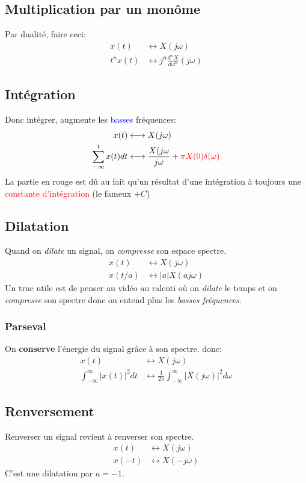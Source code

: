 \documentclass{report}
\begin{document}
\subsection{Multiplication par un monôme}
Par dualité, faire ceci:
\begin{align*}
x(t) &\longleftrightarrow X(j\omega)\\
t^nx(t) &\longleftrightarrow j^n \frac{d^nX}{d\omega^n} (j\omega)
\end{align*}
\subsection{Intégration}
Donc intégrer, augmente les \textcolor{blue}{basses} fréquences:
\begin{align*}
x(t) &\longleftrightarrow X(j\omega)\\
\sum_{-\infty}^t	x(t)dt &\longleftrightarrow \frac{X(j\omega}{j\omega} + \textcolor{red}{\pi X(0) \delta(\omega)}
\end{align*}
La partie en rouge est dû au fait qu'un résultat d'une intégration à toujours une \textcolor{red}{constante d'intégration} (le fameux $+C$)

\subsection{Dilatation}
Quand on \textit{dilate} un signal, on \textit{compresse} son espace spectre.
\begin{align*}
x(t) &\longleftrightarrow X(j\omega)\\
x(t/a) &\longleftrightarrow |a|X(aj\omega)
\end{align*}
Un truc utile est de penser au vidéo au ralenti où on \textit{dilate} le temps et on \textit{compresse} son spectre donc on entend plus les \textit{basses fréquences}.

\subsubsection{Parseval}
On \textbf{conserve} l'énergie du signal grâce à son spectre. donc:
\begin{align*}
x(t) &\longleftrightarrow X(j\omega)\\
\int_{-\infty}^{\infty} |x(t)|^2 dt &\longleftrightarrow \frac{1}{2\pi} \int_{-\infty}^{\infty} |X(j\omega)|^2 d\omega
\end{align*}

\subsection{Renversement}
Renverser un signal revient à renverser son spectre.
\begin{align*}
x(t) &\longleftrightarrow X(j\omega)\\
x(-t) &\longleftrightarrow X(-j\omega)
\end{align*}
C'est une dilatation par $a = -1$.
\end{document}
